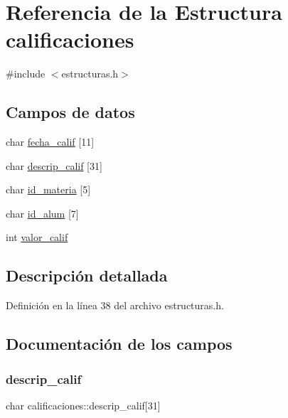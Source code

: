 \hypertarget{structcalificaciones}{}\section{Referencia de la Estructura calificaciones}
\label{structcalificaciones}


{\ttfamily \#include $<$estructuras.\+h$>$}

\subsection*{Campos de datos}
\begin{DoxyCompactItemize}
\item 
char \mbox{\hyperlink{structcalificaciones_ae8e8df42a01eb0f08c1e28d0b3b719e4}{fecha\+\_\+calif}} \mbox{[}11\mbox{]}
\item 
char \mbox{\hyperlink{structcalificaciones_a4da5aee40f1cbe0d2cf2a19a2d62cd90}{descrip\+\_\+calif}} \mbox{[}31\mbox{]}
\item 
char \mbox{\hyperlink{structcalificaciones_ab3e1ecafa94442f9ea47eee45208b08b}{id\+\_\+materia}} \mbox{[}5\mbox{]}
\item 
char \mbox{\hyperlink{structcalificaciones_a25420b2789fc7452fd044ca3b318ed92}{id\+\_\+alum}} \mbox{[}7\mbox{]}
\item 
int \mbox{\hyperlink{structcalificaciones_af79ae6ed55e0fc1bfd9746b78b75fa6c}{valor\+\_\+calif}}
\end{DoxyCompactItemize}


\subsection{Descripción detallada}


Definición en la línea 38 del archivo estructuras.\+h.



\subsection{Documentación de los campos}
\mbox{\label{structcalificaciones_a4da5aee40f1cbe0d2cf2a19a2d62cd90}} 
\subsubsection{\texorpdfstring{descrip\+\_\+calif}{descrip\_calif}}
{\footnotesize\ttfamily char calificaciones\+::descrip\+\_\+calif\mbox{[}31\mbox{]}}



